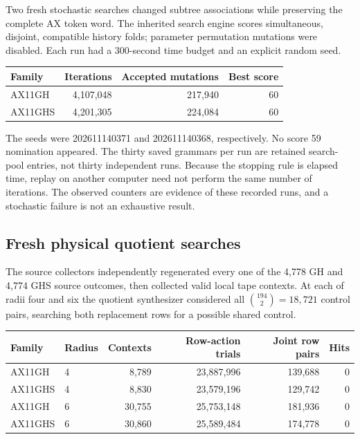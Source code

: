 \documentclass[10pt,a4paper]{article}
\begin{document}
Two fresh stochastic searches changed subtree associations while
preserving the complete AX token word. The inherited search engine
scores simultaneous, disjoint, compatible history folds; parameter
permutation mutations were disabled. Each run had a 300-second
time budget and an explicit random seed.
\begin{center}
\begin{tabular}{lrrr}
\toprule
Family & Iterations & Accepted mutations & Best score\\
\midrule
AX11GH & 4,107,048 & 217,940 & 60\\
AX11GHS & 4,201,305 & 224,084 & 60\\
\bottomrule
\end{tabular}
\end{center}
The seeds were 202611140371 and 202611140368, respectively. No score
59 nomination appeared. The thirty saved grammars per run are retained
search-pool entries, not thirty independent runs. Because the stopping
rule is elapsed time, replay on another computer need not perform the
same number of iterations. The observed counters are evidence of these
recorded runs, and a stochastic failure is not an exhaustive result.

\subsection{Fresh physical quotient searches}

The source collectors independently regenerated every one of the 4,778
GH and 4,774 GHS source outcomes, then collected valid local tape
contexts. At each of radii four and six the quotient synthesizer
considered all $\binom{194}{2}=18,721$ control pairs, searching both
replacement rows for a possible shared control.

\begin{center}\small
\begin{tabular}{llrrrr}
\toprule
Family & Radius & Contexts & Row-action trials & Joint row pairs & Hits\\
\midrule
AX11GH & 4 & 8,789 & 23,887,996 & 139,688 & 0\\
AX11GHS & 4 & 8,830 & 23,579,196 & 129,742 & 0\\
AX11GH & 6 & 30,755 & 25,753,148 & 181,936 & 0\\
AX11GHS & 6 & 30,860 & 25,589,484 & 174,778 & 0\\
\bottomrule
\end{tabular}
\end{center}
\end{document}
